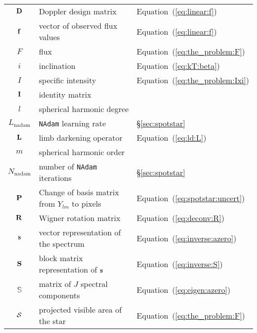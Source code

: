\documentclass[modern]{aastex62}
\begin{document}
\begin{center}
\begin{longtable}{cll}
    ${\mathbf{D}}$               & Doppler design matrix                                 & Equation~(\ref{eq:linear:f})\\
    ${\mathbf{f}}$               & vector of observed flux values                        & Equation~(\ref{eq:linear:f})\\
    $F$                      & flux                                                  & Equation~(\ref{eq:the_problem:F})\\
    $i$                      & inclination                                           & Equation~(\ref{eq:kT:beta})\\
    $I$                      & specific intensity                                    & Equation~(\ref{eq:the_problem:Ixi})\\
    ${\mathbf{I}}$               & identity matrix                                       & \\
    $l$                      & spherical harmonic degree                             & \\
    $L_\mathrm{nadam}$       & \texttt{NAdam} learning rate                          & \S\ref{sec:spotstar}\\
    ${\mathbf{L}}$               & limb darkening operator                               & Equation~(\ref{eq:ld:L})\\
    $m$                      & spherical harmonic order                              & \\
    $N_\mathrm{nadam}$       & number of \texttt{NAdam} iterations                   & \S\ref{sec:spotstar}\\
    ${\mathbf{P}}$               & Change of basis matrix from $Y_{lm}$ to pixels        & Equation~(\ref{eq:spotstar:uncert})\\
    ${\mathbf{R}}$               & Wigner rotation matrix                                & Equation~(\ref{eq:deconv:R})\\
    ${\mathbf{s}}$               & vector representation of the spectrum                 & Equation~(\ref{eq:inverse:azero})\\
    ${\mathbf{S}}$               & block matrix representation of ${\mathbf{s}}$             & Equation~(\ref{eq:inverse:S})\\
    $\boldsymbol{\mathbb{S}}$& matrix of $J$ spectral components                     & Equation~(\ref{eq:eigen:azero})\\
    $\mathcal{S}$                  & projected visible area of the star                    & Equation~(\ref{eq:the_problem:F})\\

\end{longtable}
\end{center}
\end{document}
